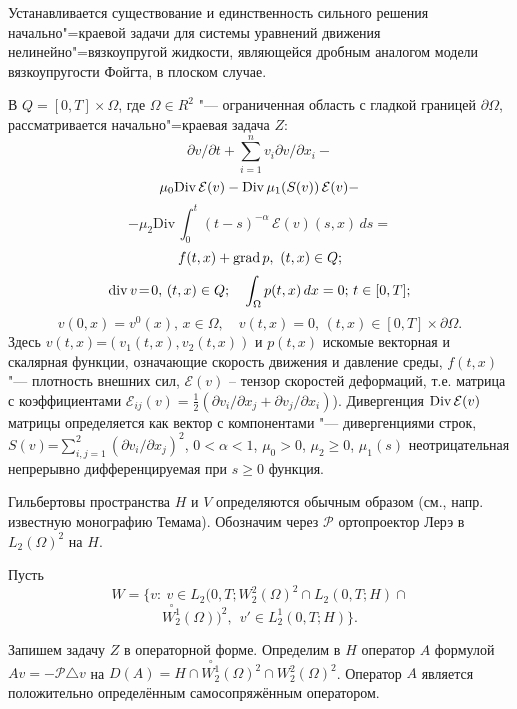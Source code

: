 \vzmscaption

Устанавливается существование и единственность сильного решения начально"=краевой задачи для системы уравнений движения нелинейно"=вязкоупругой жидкости, являющейся дробным аналогом модели вязкоупругости Фойгта, в плоском случае.

В $Q=[0,T] \times \Omega$, где $ \Omega\in R^2$ "--- ограниченная область с гладкой границей $\partial \Omega$, рассматривается начально"=краевая задача $Z$:
$$
\partial v/\partial t + {\sum_{i=1}^n } v_i \partial v /\partial x_i -
$$
$$
 \mu_0 {\rm Div}\,\mathcal{E}(v) -{\rm Div}\,\mu_1(S(v))\,\mathcal{E}(v)-
$$
$$
-\mu_2\mathrm{Div}\,\int_{0}^t(t-s)^{-\alpha}\,\mathcal{E}(v)(s, x)\,ds =
$$
$$
f(t,x)+{\rm grad} \, p,\ (t,x) \in Q;
$$
$$
{\rm div}\,v \!=\!0,\, (t,x) \in Q; \quad \int_{\Omega} p(t,x)\, dx=0;\, t\in [0,T];
$$
$$
 v(0,x) = v^0 (x), \, x\in \Omega,\quad v(t,x)=0,\, (t,x)\in [0,T]\times \partial\Omega.
$$
Здесь $v(t,x)$=$ (v_1(t,x),v_2(t,x))$ и $p(t,x)$ искомые векто\-рная и скалярная
функции, означающие скорость движе\-ния и давление среды, $f(t,x)$ "---
плотность внешних сил, $\mathcal{E}(v)$ -- тензор
скоростей деформаций, т.е. матрица с коэффициентами $\mathcal{E}_{ij}(v)\! =\! \frac 1
2 (\partial v_i/\partial x_j +\partial v_j/\partial x_i )$).
Дивергенция ${\rm Div}\, \mathcal{E}(v)$ матрицы определяется как вектор с
компонентами "--- дивергенциями строк, $S(v)$=$\sum_{i,j=1}^{2} (
\partial v_i/\partial x_j)^2$, $0<\alpha<1$, $\mu_0>0$, $\mu_2\ge 0$, $\mu_1(s)$ неотрицательная непрерывно
дифференцируемая при $s\ge 0$ функция.


 Гильбертовы пространства $H$ и $V$ определяются обычным образом
 (см., напр. известную монографию Темама).
Обозначим через $\mathcal{P}$ ортопроектор Лерэ в $L_2(\Omega)^2$ на $H$.

Пусть
$$
W\!=\{v:\ v\in L_2(0,T;W_2^2(\Omega)^2\cap L_2(0,T; H) \cap $$$$\stackrel{\circ}{W_2^1}(\Omega))^2,\ \ v'\in L_2^1(0,T;H)\}.
$$

Запишем задачу $Z$ в операторной форме.
 Определим в $H$ оператор $A$ формулой $Av=-{\mathcal{P}}\triangle v$ на $D(A)=H \cap \stackrel{\circ}{W_2^1}(\Omega)^2\cap {W_2^2}(\Omega)^2$. Оператор $A$ является положительно определённым самосопряжённым оператором.

